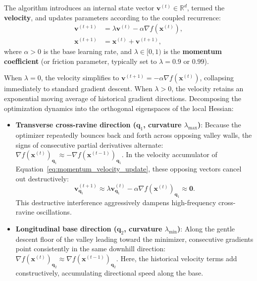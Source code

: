 The algorithm introduces an internal state vector $\mathbf{v}^{(t)} \in \mathbb{R}^d$, termed the \textbf{velocity}, and updates parameters according to the coupled recurrence:
\begin{align}
\mathbf{v}^{(t+1)} &= \lambda \mathbf{v}^{(t)} - \alpha \nabla f(\mathbf{x}^{(t)}), \label{eq:momentum_velocity_update} \\
\mathbf{x}^{(t+1)} &= \mathbf{x}^{(t)} + \mathbf{v}^{(t+1)}, \label{eq:momentum_position_update}
\end{align}
where $\alpha > 0$ is the base learning rate, and $\lambda \in [0, 1)$ is the \textbf{momentum coefficient} (or friction parameter, typically set to $\lambda = 0.9$ or $0.99$).

When $\lambda = 0$, the velocity simplifies to $\mathbf{v}^{(t+1)} = -\alpha \nabla f(\mathbf{x}^{(t)})$, collapsing immediately to standard gradient descent. When $\lambda > 0$, the velocity retains an exponential moving average of historical gradient directions. Decomposing the optimization dynamics into the orthogonal eigenspaces of the local Hessian:
\begin{itemize}[noitemsep]
  \item \textbf{Transverse cross-ravine direction ($\mathbf{q}_1$, curvature $\lambda_{\max}$)}: Because the optimizer repeatedly bounces back and forth across opposing valley walls, the signs of consecutive partial derivatives alternate: $\nabla f(\mathbf{x}^{(t)})_{\mathbf{q}_1} \approx -\nabla f(\mathbf{x}^{(t-1)})_{\mathbf{q}_1}$. In the velocity accumulator of Equation~\eqref{eq:momentum_velocity_update}, these opposing vectors cancel out destructively:
  \begin{equation}
  \mathbf{v}^{(t+1)}_{\mathbf{q}_1} \approx \lambda \mathbf{v}^{(t)}_{\mathbf{q}_1} - \alpha \nabla f(\mathbf{x}^{(t)})_{\mathbf{q}_1} \approx \mathbf{0}.
  \end{equation}
  This destructive interference aggressively dampens high-frequency cross-ravine oscillations.
  \item \textbf{Longitudinal base direction ($\mathbf{q}_2$, curvature $\lambda_{\min}$)}: Along the gentle descent floor of the valley leading toward the minimizer, consecutive gradients point consistently in the same downhill direction: $\nabla f(\mathbf{x}^{(t)})_{\mathbf{q}_2} \approx \nabla f(\mathbf{x}^{(t-1)})_{\mathbf{q}_2}$. Here, the historical velocity terms add constructively, accumulating directional speed along the base.
\end{itemize}

